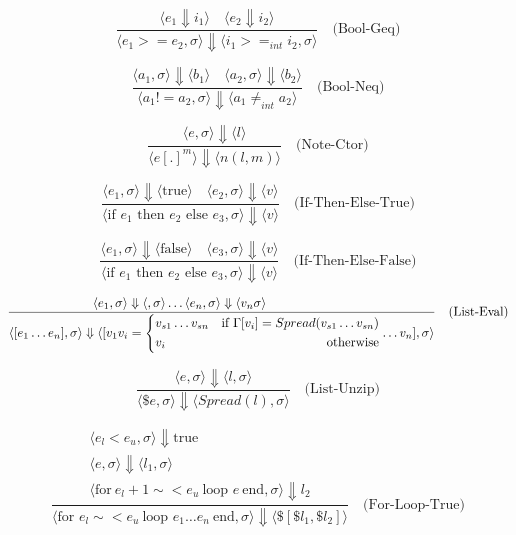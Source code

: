 \documentclass[letterpaper,12pt]{article}
\begin{document}
    \[
    \frac{\langle e_1 \Downarrow i_1 \rangle \quad \langle e_2 \Downarrow i_2 \rangle}
    {\langle e_1 >= e_2 , \sigma\rangle \Downarrow \langle i_1 >=_{int} i_2 , \sigma\rangle}  {} \quad \text{(Bool-Geq)}
    \]

    \[
    \frac{\langle a_1, \sigma \rangle \Downarrow \langle b_1 \rangle \quad \langle a_2, \sigma \rangle \Downarrow \langle b_2 \rangle}{\langle a_1 != a_2, \sigma \rangle \Downarrow \langle a_1 \neq_{int} a_2 \rangle} \quad \text{(Bool-Neq)}
    \]

    \[
    \frac{\langle e, \sigma \rangle \Downarrow \langle l \rangle}{\langle e [.]^m \rangle \Downarrow \langle n(l, m)  \rangle} \quad \text{(Note-Ctor)}
    \]

    \[
    \frac{\langle e_1, \sigma \rangle \Downarrow \langle \text{true} \rangle \quad \langle e_2, \sigma \rangle \Downarrow \langle v \rangle}{\langle \text{if } e_1 \text{ then } e_2 \text{ else } e_3, \sigma \rangle \Downarrow \langle v \rangle} \quad \text{(If-Then-Else-True)}
    \]

    \[
    \frac{\langle e_1, \sigma \rangle \Downarrow \langle \text{false} \rangle \quad \langle e_3, \sigma \rangle \Downarrow \langle v \rangle}{\langle \text{if } e_1 \text{ then } e_2 \text{ else } e_3, \sigma \rangle \Downarrow \langle v \rangle} \quad \text{(If-Then-Else-False)}
    \]

    \[
    \frac
    {
        \langle e_1, \sigma \rangle \Downarrow 
        \langle , \sigma \rangle 
        \dots \langle e_n, \sigma \rangle \Downarrow \langle v_n \sigma \rangle \\    
    }
    {\langle [e_1 \dots e_n] , \sigma  \rangle \Downarrow \langle [v_1
    v_i=\left\{
        \begin{aligned}
            &v_{s1} \dots v_{sn}  &\text{if} \ \Gamma[v_i] = Spread(v_{s1} \dots v_{sn})  \\
            &v_i &\text{otherwise} 
        \end{aligned} 
    \right.
    \dots v_n] ,\sigma \rangle}
    \quad \text{(List-Eval)}
    \]
    
    
    \[
    \frac
    {\langle e, \sigma \rangle  \Downarrow \langle  l ,\sigma \rangle} 
    {\langle \$e,\sigma \rangle \Downarrow \langle Spread(l),\sigma \rangle}
    \quad \text{(List-Unzip)}
    \]
    
    
    \[
        \frac{
            \begin{array}{c}
                \langle e_l < e_u, \sigma \rangle \Downarrow \text{true} \\
                \langle e, \sigma \rangle \Downarrow \langle l_1, \sigma \rangle \\
                \langle \text{for}\ e_l+1 \sim< e_u \ \text{loop } e \ \text{end}, \sigma \rangle \Downarrow l_2
            \end{array}
        }{
            \langle \text{for } e_l \sim< e_u \ \text{loop } e_1 \dots e_n \ \text{end}, \sigma \rangle \Downarrow 
            \langle \$[\$l_1, \$l_2] \rangle
        }
        \quad \text{(For-Loop-True)}
    \]
\end{document}
